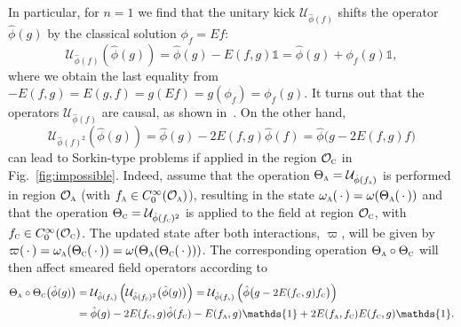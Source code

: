 \documentclass[letterpaper,12pt,titlepage,oneside,final]{book}
\newcommand{\openone}{\mathds{1}}
\newcommand{\tc}[1]{\textsc{#1}}
\begin{document}
In particular, for $n=1$ we find that the unitary kick $\mathcal{U}_{\hat{\phi}(f)}$ shifts the operator $\hat{\phi}(g)$ by the classical solution $\phi_f = Ef$:
\begin{equation}
    \mathcal{U}_{\hat{\phi}(f)}(\hat{\phi}(g)) = \hat{\phi}(g) - E(f,g)\openone = \hat{\phi}(g) + \phi_f(g)
    \openone,
\end{equation}
where we obtain the last equality from $-E(f,g) = E(g,f) = g(Ef) = g(\phi_f) = \phi_f(g)$. It turns out that the operators $\mathcal{U}_{\hat{\phi}(f)}$ are causal, as shown in~\cite{IanJubb}. On the other hand,
\begin{equation}
     \mathcal{U}_{\hat{\phi}(f)^2}(\hat{\phi}(g)) = \hat{\phi}(g) - 2E(f,g)\hat{\phi}(f) = \hat{\phi}\big(g - 2 E(f,g) f\big)
\end{equation}
can lead to Sorkin-type problems if applied in the region $\mathcal{O}_\tc{c}$ in Fig.~\ref{fig:impossible}. Indeed, assume that the operation $\Theta_\tc{a} = \mathcal{U}_{\hat{\phi}(f_\tc{a})}$ is performed in region $\mathcal{O}_\tc{a}$ (with $f_\tc{a}\in C_0^\infty(\mathcal{O}_\tc{a})$), resulting in the state $\omega_\tc{a}(\,\cdot\,) = \omega(\Theta_\tc{a}(\,\cdot\,))$ and that the operation $\Theta_\tc{c} = \mathcal{U}_{\hat{\phi}(f_\tc{c})^2}$ is applied to the field at region $\mathcal{O}_\tc{c}$, with $f_\tc{c}\in C_0^\infty(\mathcal{O}_\tc{c})$. The updated state after both interactions, $\varpi$, will be given by $\varpi(\,\cdot\,) = \omega_\tc{a}(\Theta_\tc{c}(\,\cdot\,)) = \omega(\Theta_\tc{a}(\Theta_\tc{c}(\,\cdot\,)))$. The corresponding operation $\Theta_\tc{a}\circ\Theta_\tc{c}$ will then affect smeared field operators according to
\begin{align}
    \Theta_\tc{a}\circ\Theta_\tc{c}\big(\hat{\phi}(g)\big) &= \mathcal{U}_{\hat{\phi}(f_\tc{a})}\left(\mathcal{U}_{\hat{\phi}(f_\tc{c})^2}\big(\hat{\phi}(g)\big)\right) = \mathcal{U}_{\hat{\phi}(f_\tc{a})}\left(\hat{\phi}\big(g - 2 E(f_\tc{c},g) f_\tc{c}\big)\right)\\
    &= \hat{\phi}(g) - 2 E(f_\tc{c},g)\hat{\phi}(f_\tc{c}) - E(f_\tc{a},g)\openone + 2 E(f_\tc{a},f_\tc{c})E(f_\tc{c},g)\openone.
\end{align}
\end{document}
